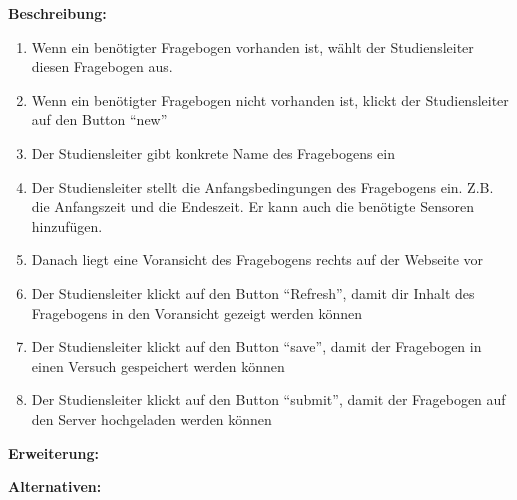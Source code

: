 \documentclass[a4paper]{scrreprt}
\begin{document}
\begin{itemize}
                \par \textbf{Beschreibung: }
                \begin{enumerate}
                    \item Wenn ein benötigter Fragebogen vorhanden ist, wählt der \gls{Studiensleiter} diesen Fragebogen aus.
                    \item Wenn ein benötigter Fragebogen nicht vorhanden ist, klickt der \gls{Studiensleiter} auf den Button ``new''
                    \item Der \gls{Studiensleiter} gibt konkrete Name des Fragebogens ein
                    \item Der \gls{Studiensleiter} stellt die Anfangsbedingungen des Fragebogens ein. Z.B. die Anfangszeit und die Endeszeit. Er kann auch die benötigte Sensoren hinzufügen.
                    \item Danach liegt eine Voransicht des Fragebogens rechts auf der Webseite vor
                    \item  Der \gls{Studiensleiter} klickt auf den Button ``Refresh'', damit dir Inhalt des Fragebogens in den Voransicht gezeigt werden können
                    \item Der \gls{Studiensleiter} klickt auf den Button ``save'', damit der Fragebogen in einen Versuch gespeichert werden können
                    \item Der \gls{Studiensleiter} klickt auf den Button ``submit'', damit der Fragebogen auf den Server hochgeladen werden können
                \end{enumerate}
                \par \textbf{Erweiterung: }
                \par \textbf{Alternativen: }



\end{itemize}
\end{document}
